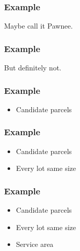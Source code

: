 \documentclass[10pt, compress]{beamer}
\begin{document}
\begin{frame}[fragile]
  \frametitle{Example}
  \begin{center}
\end{center}
Maybe call it Pawnee.
\end{frame}

\begin{frame}[fragile]
  \frametitle{Example}
  \begin{center}
\end{center}
But definitely not.
\end{frame}

\begin{frame}[fragile]
  \frametitle{Example}
  \begin{center}
\end{center}
\begin{itemize}
\item Candidate parcels
\end{itemize}
\end{frame}

\begin{frame}[fragile]
  \frametitle{Example}
  \begin{center}
\end{center}
\begin{itemize}
\item Candidate parcels
\item Every lot same size
\end{itemize}
\end{frame}

\begin{frame}[fragile]
  \frametitle{Example}
  \begin{center}
\end{center}
\begin{itemize}
\item Candidate parcels
\item Every lot same size
\item Service area
\end{itemize}
\end{frame}
\end{document}
